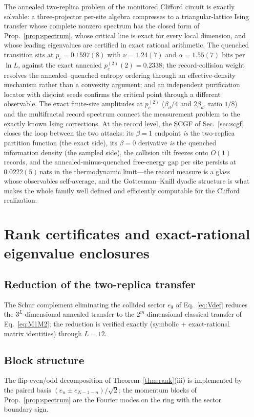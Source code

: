 \documentclass[11pt]{article}
\newcommand{\pctwo}{p_c^{(2)}}
\begin{document}
The annealed two-replica problem of the monitored Clifford circuit is
exactly solvable: a three-projector per-site algebra compresses to a
triangular-lattice Ising transfer whose complete nonzero spectrum has the
closed form of Prop.~\ref{prop:spectrum}, whose critical line is exact for
every local dimension, and whose leading eigenvalues are certified in exact
rational arithmetic.  The quenched transition sits at $p_c=0.1597(8)$ with
$\nu=1.24(7)$ and $\alpha=1.55(7)$ bits per $\ln L$, against the exact
annealed $\pctwo(2)=0.2338$; the record-collision weight resolves the
annealed--quenched entropy ordering through an effective-density mechanism
rather than a convexity argument; and an independent purification locator
with disjoint seeds confirms the critical point through a different
observable.  The exact finite-size amplitudes at $\pctwo$
($\beta_d/4$ and $2\beta_d$, ratio $1/8$) and the multifractal record
spectrum connect the measurement problem to the exactly known Ising
corrections.  At the record level, the SCGF of Sec.~\ref{sec:scgf} closes
the loop between the two attacks: its $\beta=1$ endpoint \emph{is} the
two-replica partition function (the exact side), its $\beta=0$ derivative
\emph{is} the quenched information density (the sampled side), the
collision tilt freezes onto $O(1)$ records, and the annealed-minus-quenched
free-energy gap per site persists at $0.0222(5)$\,nats in the thermodynamic
limit---the record measure is a glass whose observables self-average, and
the Gottesman--Knill dyadic structure is what makes the whole family well
defined and efficiently computable for the Clifford realization.

\appendix

\section{Rank certificates and exact-rational eigenvalue enclosures}
\label{app:rank3}

\subsection{Reduction of the two-replica transfer}
\label{app:reduction}
The Schur complement eliminating the collided sector $e_0$ of
Eq.~\eqref{eq:Vdef} reduces the $3^L$-dimensional annealed transfer to the
$2^m$-dimensional classical transfer of Eq.~\eqref{eq:M1M2}; the reduction
is verified exactly (symbolic + exact-rational matrix identities) through
$L=12$.

\subsection{Block structure}
\label{app:blocks}
The flip-even/odd decomposition of Theorem~\ref{thm:rank}(iii) is
implemented by the paired basis
$(e_n\pm e_{N-1-n})/\sqrt2$; the momentum blocks of Prop.~\ref{prop:spectrum}
are the Fourier modes on the ring with the sector boundary sign.
\end{document}
